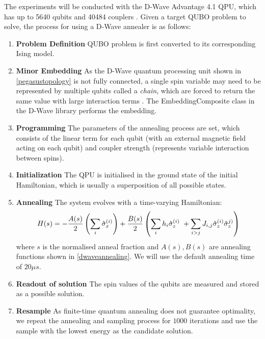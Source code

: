 The experiments will be conducted with the D-Wave Advantage 4.1 QPU, which has up to 5640 qubits and 40484 couplers \cite{dwaveadvantage}. Given a target QUBO problem to solve, the process for using a D-Wave annealer is as follows:
\begin{enumerate}
    \item \textbf{Problem Definition} QUBO problem is first converted to its corresponding Ising model.
    \item \textbf{Minor Embedding} As the D-Wave quantum processing unit shown in \autoref{pegasustopology} is not fully connected, a single spin variable may need to be represented by multiple qubits called a \textit{chain}, which are forced to return the same value with large interaction terms \cite{b16}. The EmbeddingComposite class in the D-Wave library performs the embedding.
    \item \textbf{Programming} The parameters of the annealing process are set, which consists of the linear term for each qubit (with an external magnetic field acting on each qubit) and coupler strength (represents variable interaction between spins).
    \item \textbf{Initialization} The QPU is initialised in the ground state of the initial Hamiltonian, which is usually a superposition of all possible states.
    \item \textbf{Annealing} The system evolves with a time-varying Hamiltonian:
    \begin{equation}
        \label{eqn:dwavehamiltonian}
        H(s) = -\frac{A(s)}{2}\left(\sum_{i} \Hat{\sigma}_x^{(i)}\right) + \frac{B(s)}{2}\left(\sum_{i}h_i \Hat{\sigma}_z^{(i)}\ + \sum_{i > j}J_{i,j} \Hat{\sigma}_z^{(i)}\Hat{\sigma}_z^{j)}\right)
    \end{equation}
    where $s$ is the normalised anneal fraction and $A(s), B(s)$ are annealing functions shown in \autoref{dwaveannealing}. We will use the default annealing time of $20\mu s$. 
    \item \textbf{Readout of solution} The spin values of the qubits are measured and stored as a possible solution.
    \item \textbf{Resample} As finite-time quantum annealing does not guarantee optimality, we repeat the annealing and sampling process for $1000$ iterations and use the sample with the lowest energy as the candidate solution.
\end{enumerate}

